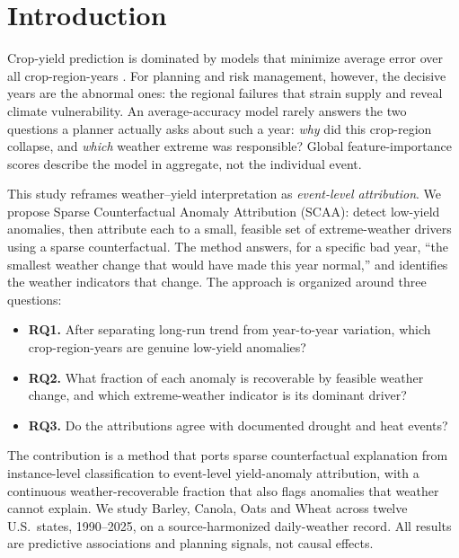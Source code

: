 \documentclass[11pt]{article}
\begin{document}
\section{Introduction}
\label{sec:intro}
Crop-yield prediction is dominated by models that minimize average error over all
crop-region-years \citep{vanKlompenburg2020CropYieldReview,Jabed2024Comprehensive}.
For planning and risk management, however, the decisive years are the abnormal ones:
the regional failures that strain supply and reveal climate vulnerability. An
average-accuracy model rarely answers the two questions a planner actually asks about
such a year: \emph{why} did this crop-region collapse, and \emph{which} weather
extreme was responsible? Global feature-importance scores describe the model in
aggregate, not the individual event.

This study reframes weather--yield interpretation as \emph{event-level attribution}.
We propose Sparse Counterfactual Anomaly Attribution (SCAA): detect low-yield
anomalies, then attribute each to a small, feasible set of extreme-weather drivers
using a sparse counterfactual. The method answers, for a specific bad year, ``the
smallest weather change that would have made this year normal,'' and identifies the
weather indicators that change. The approach is organized around three questions:
\begin{itemize}
\item \textbf{RQ1.} After separating long-run trend from year-to-year variation, which
crop-region-years are genuine low-yield anomalies?
\item \textbf{RQ2.} What fraction of each anomaly is recoverable by feasible weather
change, and which extreme-weather indicator is its dominant driver?
\item \textbf{RQ3.} Do the attributions agree with documented drought and heat events?
\end{itemize}
The contribution is a method that ports sparse counterfactual explanation
\citep{Mothilal2020DiCE} from instance-level classification to event-level yield-anomaly
attribution, with a continuous weather-recoverable fraction that also flags anomalies
that weather cannot explain. We study Barley, Canola, Oats and Wheat across twelve
U.S.\ states, 1990--2025, on a source-harmonized daily-weather record. All results are
predictive associations and planning signals, not causal effects.
\end{document}

